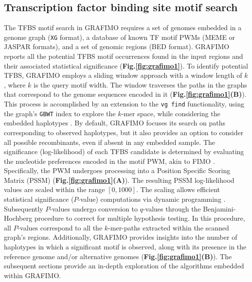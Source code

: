 \documentclass[a4paper, titlepage, openright]{book}
\newcommand{\grafimo}{GRAFIMO\xspace}
\begin{document}
\subsection{Transcription factor binding site motif search}
The TFBS motif search in \grafimo requires a set of genomes embedded in a genome graph (\texttt{XG} format), a database of known TF motif PWMs (MEME or JASPAR formats), and a set of genomic regions (BED format). \grafimo reports all the potential TFBS motif occurrences found in the input regions and their associated statistical significance (\textbf{Fig.\ref{fig:grafimo1}}). To identify potential TFBS, \grafimo employs a sliding window approach with a window length of $k$, where $k$ is the query motif width. The window traverses the paths in the graphs that correspond to the genome sequences encoded in it (\textbf{Fig.\ref{fig:grafimo1}(B)}). This process is accomplished by an extension to the \texttt{vg find} functionality, using the graph's \texttt{GBWT} index to explore the $k$-mer space, while considering the embedded haplotypes \citep{siren2020haplotype}. By default, \grafimo focuses its search on paths corresponding to observed haplotypes, but it also provides an option to consider all possible recombinants, even if absent in any embedded sample. The significance (log-likelihood) of each TFBS candidate is determined by evaluating the nucleotide preferences encoded in the motif PWM, akin to FIMO \citep{grant2011fimo}. Specifically, the PWM undergoes processing into a Position Specific Scoring Matrix (PSSM) (\textbf{Fig.\ref{fig:grafimo1}(A)}). The resulting PSSM log-likelihood values are scaled within the range $[0, 1000]$. The scaling allows efficient statistical significance ($P$-value) computations via dynamic programming \citep{grant2011fimo}. Subsequently $P$-values undergo conversion to $q$-values through the Benjamini-Hochberg procedure to correct for multiple hypothesis testing. In this procedure, all $P$-values correspond to all the $k$-mer-paths extracted within the scanned graph's regions. Additionally, \grafimo provides insights into the number of haplotypes in which a significant motif is observed, along with its presence in the reference genome and/or alternative genomes (\textbf{Fig.\ref{fig:grafimo1}(B)}). The subsequent sections provide an in-depth exploration of the algorithms embedded within \grafimo.
\end{document}
